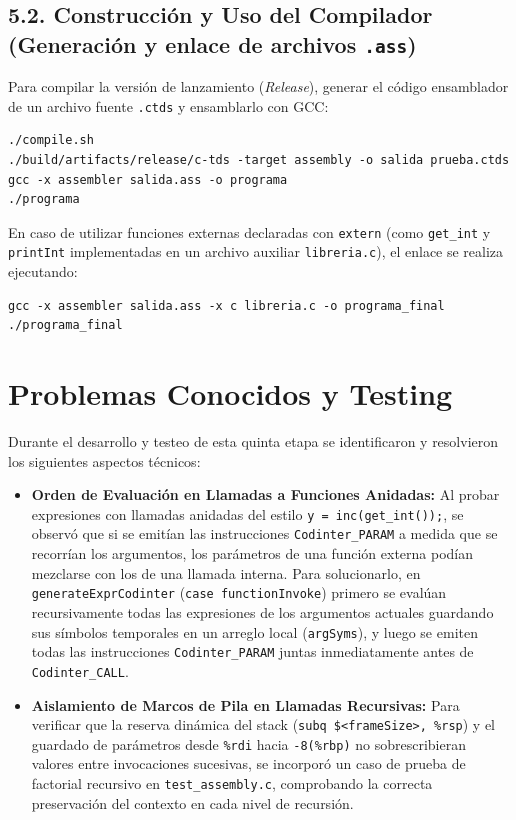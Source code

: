 \documentclass[12pt, a4paper]{article}
\begin{document}
\subsection*{5.2. Construcción y Uso del Compilador (Generación y enlace de archivos \texttt{.ass})}
Para compilar la versión de lanzamiento (\textit{Release}), generar el código ensamblador de un archivo fuente \texttt{.ctds} y ensamblarlo con GCC:
\begin{verbatim}
./compile.sh
./build/artifacts/release/c-tds -target assembly -o salida prueba.ctds
gcc -x assembler salida.ass -o programa
./programa
\end{verbatim}
En caso de utilizar funciones externas declaradas con \texttt{extern} (como \texttt{get\_int} y \texttt{printInt} implementadas en un archivo auxiliar \texttt{libreria.c}), el enlace se realiza ejecutando:
\begin{verbatim}
gcc -x assembler salida.ass -x c libreria.c -o programa_final
./programa_final
\end{verbatim}

\section{Problemas Conocidos y Testing}
Durante el desarrollo y testeo de esta quinta etapa se identificaron y resolvieron los siguientes aspectos técnicos:

\begin{itemize}
    \item \textbf{Orden de Evaluación en Llamadas a Funciones Anidadas:} Al probar expresiones con llamadas anidadas del estilo \texttt{y = inc(get\_int());}, se observó que si se emitían las instrucciones \texttt{Codinter\_PARAM} a medida que se recorrían los argumentos, los parámetros de una función externa podían mezclarse con los de una llamada interna. Para solucionarlo, en \texttt{generateExprCodinter} (\texttt{case functionInvoke}) primero se evalúan recursivamente todas las expresiones de los argumentos actuales guardando sus símbolos temporales en un arreglo local (\texttt{argSyms}), y luego se emiten todas las instrucciones \texttt{Codinter\_PARAM} juntas inmediatamente antes de \texttt{Codinter\_CALL}.
    \item \textbf{Aislamiento de Marcos de Pila en Llamadas Recursivas:} Para verificar que la reserva dinámica del stack (\texttt{subq \$<frameSize>, \%rsp}) y el guardado de parámetros desde \texttt{\%rdi} hacia \texttt{-8(\%rbp)} no sobrescribieran valores entre invocaciones sucesivas, se incorporó un caso de prueba de factorial recursivo en \texttt{test\_assembly.c}, comprobando la correcta preservación del contexto en cada nivel de recursión.
\end{itemize}
\end{document}
